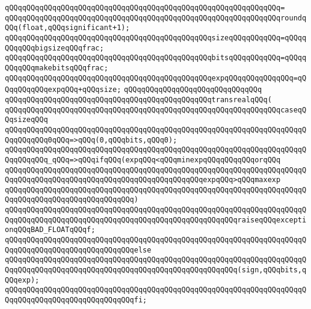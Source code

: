 \verb|qQQqqQQqqQQqqQQqqQQqqQQqqQQqqQQqqQQqqQQqqQQqqQQqqQQqqQQqqQQqqQQq=|\newline
\verb|qQQqqQQqqQQqqQQqqQQqqQQqqQQqqQQqqQQqqQQqqQQqqQQqqQQqqQQqqQQqqQQqroundqQQq(float,qQQqsignificant+1);|\newline
\newline
\verb|qQQqqQQqqQQqqQQqqQQqqQQqqQQqqQQqqQQqqQQqqQQqqQQqsizeqQQqqQQqqQQq=qQQqqQQqqQQqbigsizeqQQqfrac;|\newline
\verb|qQQqqQQqqQQqqQQqqQQqqQQqqQQqqQQqqQQqqQQqqQQqqQQqbitsqQQqqQQqqQQq=qQQqqQQqqQQqmakebitsqQQqfrac;|\newline
\verb|qQQqqQQqqQQqqQQqqQQqqQQqqQQqqQQqqQQqqQQqqQQqqQQqexpqQQqqQQqqQQqqQQq=qQQqqQQqqQQqexpqQQq+qQQqsize;|\newline
\newline
\verb|qQQqqQQqqQQqqQQqqQQqqQQqqQQqqQQq|\newline
\verb|qQQqqQQqqQQqqQQqqQQqqQQqqQQqqQQqqQQqqQQqqQQqqQQqtransrealqQQq(|\newline
\newline
\verb|qQQqqQQqqQQqqQQqqQQqqQQqqQQqqQQqqQQqqQQqqQQqqQQqqQQqqQQqqQQqqQQqcaseqQQqsizeqQQq|\newline
\newline
\verb|qQQqqQQqqQQqqQQqqQQqqQQqqQQqqQQqqQQqqQQqqQQqqQQqqQQqqQQqqQQqqQQqqQQqqQQqqQQqqQQq0qQQq=>qQQq(0,qQQqbits,qQQq0);|\newline
\newline
\verb|qQQqqQQqqQQqqQQqqQQqqQQqqQQqqQQqqQQqqQQqqQQqqQQqqQQqqQQqqQQqqQQqqQQqqQQqqQQqqQQq_qQQq=>qQQqifqQQq(expqQQq<qQQqminexpqQQqqQQqqQQqorqQQq|\newline
\verb|qQQqqQQqqQQqqQQqqQQqqQQqqQQqqQQqqQQqqQQqqQQqqQQqqQQqqQQqqQQqqQQqqQQqqQQqqQQqqQQqqQQqqQQqqQQqqQQqqQQqqQQqqQQqqQQqqQQqexpqQQq>qQQqmaxexp|\newline
\verb|qQQqqQQqqQQqqQQqqQQqqQQqqQQqqQQqqQQqqQQqqQQqqQQqqQQqqQQqqQQqqQQqqQQqqQQqqQQqqQQqqQQqqQQqqQQqqQQqqQQq)|\newline
\verb|qQQqqQQqqQQqqQQqqQQqqQQqqQQqqQQqqQQqqQQqqQQqqQQqqQQqqQQqqQQqqQQqqQQqqQQqqQQqqQQqqQQqqQQqqQQqqQQqqQQqqQQqqQQqqQQqqQQqqQQqqQQqraiseqQQqexceptionqQQqBAD_FLOATqQQqf;|\newline
\verb|qQQqqQQqqQQqqQQqqQQqqQQqqQQqqQQqqQQqqQQqqQQqqQQqqQQqqQQqqQQqqQQqqQQqqQQqqQQqqQQqqQQqqQQqqQQqqQQqqQQqelse|\newline
\verb|qQQqqQQqqQQqqQQqqQQqqQQqqQQqqQQqqQQqqQQqqQQqqQQqqQQqqQQqqQQqqQQqqQQqqQQqqQQqqQQqqQQqqQQqqQQqqQQqqQQqqQQqqQQqqQQqqQQqqQQqqQQq(sign,qQQqbits,qQQqexp);|\newline
\verb|qQQqqQQqqQQqqQQqqQQqqQQqqQQqqQQqqQQqqQQqqQQqqQQqqQQqqQQqqQQqqQQqqQQqqQQqqQQqqQQqqQQqqQQqqQQqqQQqqQQqfi;|\newline
